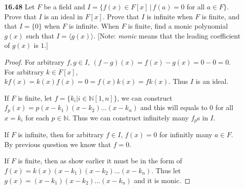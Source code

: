 \documentclass[11pt, oneside]{article}
\newcommand{\N}{\mathbb N}
\begin{document}
\begin{enumerate}
\newpage
\item[{\bf 16.48}] Let $F$ be a field and $I=\{f(x)\in F[x] \,|\, f(a)=0$ for all $a\in F\}$. Prove that $I$ is an ideal in $F[x]$. Prove that $I$ is infinite when $F$ is finite, and that $I=\{0\}$ when $F$ is infinite. When $F$ is finite, find a monic polynomial $g(x)$ such that $I=\langle g(x)\rangle$. [Note: {\it monic} means that the leading coefficient of $g(x)$ is $1$.]
\begin{proof}
For arbitrary $f,g\in I$, $(f-g)(x)=f(x)-g(x)=0-0=0$. For arbitrary $k\in F[x]$, $kf(x)=k(x)f(x)=0=f(x)k(x)=fk(x)$. Thus $I$ is an ideal. 

If $F$ is finite, let $f=\{k_i|i\in \N [1,n]\}$, we can construct $f_p(x)=p(x-k_1)(x-k_2)...(x-k_n)$ and this will equals to 0 for all $x=k_i$ for each $p\in \N$. Thus we can construct infinitely many $f_p$s in $I$.

If $F$ is infinite, then for arbitrary $f\in I$, $f(x)=0$ for infinitly many $a\in F$. By previous question we know that $f=0$.

If $F$ is finite, then as show earlier it must be in the form of $f(x)=k(x)(x-k_1)(x-k_2)...(x-k_n)$. Thus let $g(x)=(x-k_1)(x-k_2)...(x-k_n)$ and it is monic. 
\end{proof}


\end{enumerate}
\end{document}

